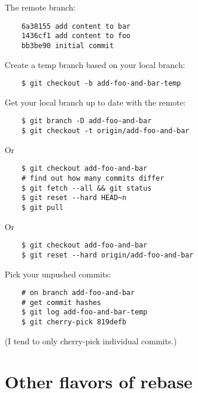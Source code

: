 \documentclass[11pt,xetex]{beamer}
\begin{document}
\begin{frame}[fragile]{}
  \Large
  The remote branch:

  \begin{verbatim}
    6a38155 add content to bar
    1436cf1 add content to foo
    bb3be90 initial commit
  \end{verbatim}
\end{frame}

\begin{frame}[fragile]{}
  \Large
  Create a temp branch based on your local branch:

  \begin{verbatim}
    $ git checkout -b add-foo-and-bar-temp
  \end{verbatim}
\end{frame}

\begin{frame}[fragile]{}
  \Large
  Get your local branch up to date with the remote:

  \begin{verbatim}
    $ git branch -D add-foo-and-bar
    $ git checkout -t origin/add-foo-and-bar
  \end{verbatim}
  \pause

  Or

  \begin{verbatim}
    $ git checkout add-foo-and-bar
    # find out how many commits differ
    $ git fetch --all && git status
    $ git reset --hard HEAD~n
    $ git pull
  \end{verbatim}
  \pause

  Or

  \begin{verbatim}
    $ git checkout add-foo-and-bar
    $ git reset --hard origin/add-foo-and-bar
  \end{verbatim}
\end{frame}

\begin{frame}[fragile]{}
  \Large
  Pick your unpushed commits:

  \begin{verbatim}
    # on branch add-foo-and-bar
    # get commit hashes
    $ git log add-foo-and-bar-temp
    $ git cherry-pick 819defb
  \end{verbatim}

  \normalsize
  (I tend to only cherry-pick individual commits.)
\end{frame}

\section*{Other flavors of rebase}
\end{document}
